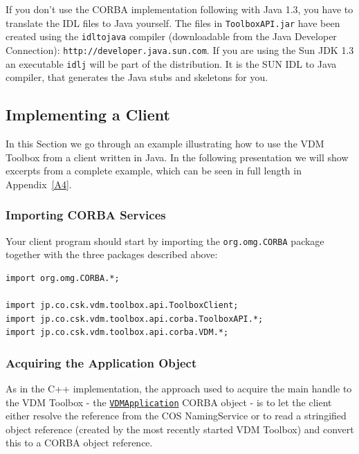 \documentclass[\pformat,12pt]{article}
\newcommand{\VDMApplication}{\hyperlink{interface.VDMApplication}{VDMApplication}}
\begin{document}
If you don't use the CORBA implementation following with Java 1.3, you
have to translate the IDL files to Java yourself. The files in
\texttt{ToolboxAPI.jar} have been created using the {\tt idltojava}
compiler (downloadable from the Java Developer Connection): 
\verb+http://developer.java.sun.com+. If you are using the Sun JDK 1.3
an executable {\tt idlj} will be part of the distribution. It is the
SUN IDL to Java compiler, that generates the Java stubs and skeletons
for you.


\subsection{Implementing a Client}

In this Section we go through an example illustrating how to use the
VDM Toolbox from a client written in Java. In the following
presentation we will show excerpts from a complete example, which can
be seen in full length in Appendix~\ref{A4}. 

\subsubsection{Importing CORBA Services}

Your client program should start by importing the {\tt org.omg.CORBA}
package together with the three packages described above:

\begin{verbatim}
import org.omg.CORBA.*;

import jp.co.csk.vdm.toolbox.api.ToolboxClient;
import jp.co.csk.vdm.toolbox.api.corba.ToolboxAPI.*;
import jp.co.csk.vdm.toolbox.api.corba.VDM.*;
\end{verbatim}


\subsubsection{Acquiring the Application Object}

As in the C++ implementation, the approach used to acquire the main 
handle to the VDM Toolbox - the
{\tt \VDMApplication} CORBA object - is to let the client either resolve
the reference from the COS NamingService or to read a
stringified object reference (created by the most recently started VDM
Toolbox) and convert this to a CORBA object reference.  
\end{document}
